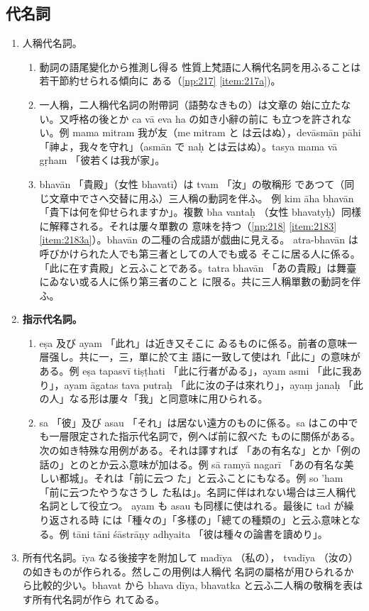\subsection{代名詞}
\numberParagraph
\begin{enumerate}[label=(\arabic*)]
\item 人稱代名詞。
\begin{enumerate}[label=(\alph*)]
\item 動詞の語尾變化から推測し得る
性質上梵語に人稱代名詞を用ふることは若干節約せられる傾向に
ある（\ref{np:217} \ref{item:217a})。
\item 一人稱，二人稱代名詞の附帶詞（語勢なきもの）は文章の
始に立たない。又呼格の後とか ca vā eva ha の如き小辭の前に
も立つを許されない。例 mama mitram 我が友（me mitram と
は云はぬ），devāsmān pāhi 「神よ，我々を守れ」（asmān で
naḥ とは云はぬ）。tasya mama vā gṛham 「彼若くは我が家」。
\item bhavān 「貴殿」（女性 bhavatī）は tvam 「汝」の敬稱形
であつて（同じ文章中でさへ交替に用ふ）三人稱の動詞を伴ふ。
例 kim āha bhavān 「貴下は何を仰せられますか」。複數 bha\-%
vantaḥ （女性 bhavatyḥ）同樣に解釋される。それは屢々單數の
意味を持つ（\ref{np:218} \ref{item:2183} \ref{item:2183a}）。bhavān の二種の合成語が戯曲に見える。
atra-bhavān は呼びかけられた人でも第三者としての人でも或る
そこに居る人に係る。「此に在す貴殿」と云ふことである。tatra\-%
bhavān 「あの貴殿」は舞臺にゐない或る人に係り第三者のこと
に限る。共に三人稱單數の動詞を伴ふ。
\end{enumerate}
\item \textbf{指示代名詞。}
\begin{enumerate}[label=(\alph*)]
\item eṣa 及び ayam 「此れ」は近き又そこに
ゐるものに係る。前者の意味一層强し。共に一，三，單に於て主
語に一致して使はれ「此に」の意味がある。例 eṣa tapasvī
tiṣṭhati 「此に行者がゐる」，ayam asmi 「此に我あり」，ayam
āgatas tava putraḥ 「此に汝の子は來れり」，ayaṃ janaḥ 「此
の人」なる形は屢々「我」と同意味に用ひられる。
\item sa 「彼」及び asau 「それ」は居ない遠方のものに係る。sa
はこの中でも一層限定された指示代名詞で，例へば前に叙べた
ものに關係がある。次の如き特殊な用例がある。それは譯すれば
「あの有名な」とか「例の話の」とのとか云ふ意味が加はる。例
sā ramyā nagarī 「あの有名な美しい都城」。それは「前に云つ
た」と云ふことにもなる。例 so 'ham 「前に云つたやうなさうし
た私は」。名詞に伴はれない場合は三人稱代名詞として役立つ。
ayam も asau も同樣に使はれる。最後に tad が繰り返される時
には「種々の」「多樣の」「總ての種類の」と云ふ意味となる。例
tāni tāni śāstrāṇy adhyaita 「彼は種々の論書を讀めり」。
\end{enumerate}
\item 所有代名詞。īya なる後接字を附加して madīya （私の），
tvadīya （汝の）の如きものが作られる。然しこの用例は人稱代
名詞の屬格が用ひられるから比較的少い。bhavat から bhava\-%
dīya, bhavatka と云ふ二人稱の敬稱を表はす所有代名詞が作ら
れてゐる。
\end{enumerate}

